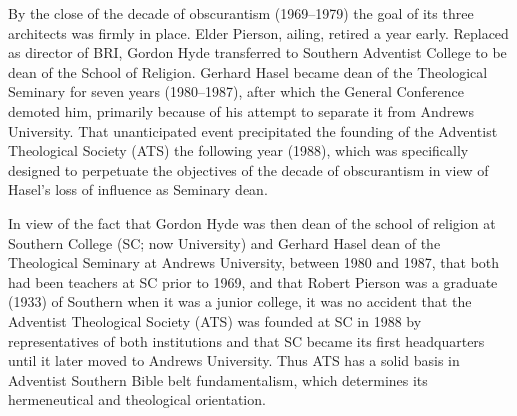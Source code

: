 By the close of the decade of obscurantism (1969--1979) the goal of its three
architects was firmly in place. Elder Pierson, ailing, retired a year early.
Replaced as director of BRI, Gordon Hyde transferred to Southern Adventist
College to be dean of the School of Religion. Gerhard Hasel became dean of
the Theological Seminary for seven years (1980--1987), after which the
General Conference demoted him, primarily because of his attempt to separate
it from Andrews University.
That unanticipated event precipitated the
founding of the Adventist Theological Society (ATS) the following year
(1988), which was specifically designed to perpetuate the objectives of the
decade of obscurantism in view of Hasel's loss of influence as Seminary
dean.

In view of the fact that Gordon Hyde was then dean of the school of religion
at Southern College (SC; now University) and Gerhard Hasel dean
of the Theological Seminary at Andrews University, between 1980 and 1987,
that both had been teachers at SC prior to 1969, and that Robert Pierson
was a graduate (1933) of Southern when it was a junior college, it was no
accident that the Adventist Theological Society (ATS) was founded at SC in
1988 by representatives of both institutions and that SC became its first
headquarters until it later moved to Andrews University. Thus ATS has a
solid basis in Adventist Southern Bible belt fundamentalism, which
determines its hermeneutical and theological orientation.

